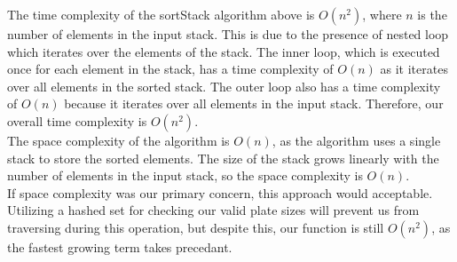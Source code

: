 \documentclass[a4paper]{article}
\begin{document}
The time complexity of the sortStack algorithm above is $O(n^2)$, 
where $n$ is the number of elements in the input stack. 
This is due to the presence of nested loop which iterates over the elements of the stack. 
The inner loop, which is executed once for each element in the stack,
has a time complexity of $O(n)$ as it iterates over all elements in the sorted stack.
The outer loop also has a time complexity of $O(n)$ because it iterates over all elements in the input stack.
Therefore, our overall time complexity is $O(n^2)$.\\

The space complexity of the algorithm is $O(n)$, as the algorithm uses a single stack to store the sorted elements.
The size of the stack grows linearly with the number of elements in the input stack, so the space complexity is $O(n)$. \\


If space complexity was our primary concern, this approach would acceptable.
Utilizing a hashed set for checking our valid plate sizes will prevent us from traversing during this operation, 
but despite this, our function is still $O(n^2)$, as the fastest growing term takes precedant. \pagebreak




\end{document}
